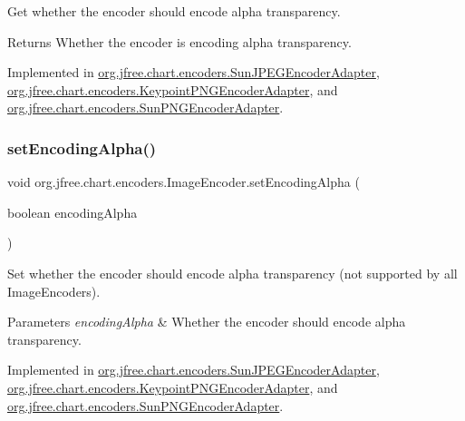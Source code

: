 Get whether the encoder should encode alpha transparency.

\begin{DoxyReturn}{Returns}
Whether the encoder is encoding alpha transparency. 
\end{DoxyReturn}


Implemented in \mbox{\hyperlink{classorg_1_1jfree_1_1chart_1_1encoders_1_1_sun_j_p_e_g_encoder_adapter_a1d9fb1cf5b9a4c0db2ed038a83fd4355}{org.\+jfree.\+chart.\+encoders.\+Sun\+J\+P\+E\+G\+Encoder\+Adapter}}, \mbox{\hyperlink{classorg_1_1jfree_1_1chart_1_1encoders_1_1_keypoint_p_n_g_encoder_adapter_a73ca86c91d8420342f9993c0286e0408}{org.\+jfree.\+chart.\+encoders.\+Keypoint\+P\+N\+G\+Encoder\+Adapter}}, and \mbox{\hyperlink{classorg_1_1jfree_1_1chart_1_1encoders_1_1_sun_p_n_g_encoder_adapter_adc379d171449112333184b52e7292df8}{org.\+jfree.\+chart.\+encoders.\+Sun\+P\+N\+G\+Encoder\+Adapter}}.

\mbox{\label{interfaceorg_1_1jfree_1_1chart_1_1encoders_1_1_image_encoder_a1f75e96b9ec512882b6d32c4f0bac3d2}} 
\subsubsection{\texorpdfstring{set\+Encoding\+Alpha()}{setEncodingAlpha()}}
{\footnotesize\ttfamily void org.\+jfree.\+chart.\+encoders.\+Image\+Encoder.\+set\+Encoding\+Alpha (\begin{DoxyParamCaption}\item[{boolean}]{encoding\+Alpha }\end{DoxyParamCaption})}

Set whether the encoder should encode alpha transparency (not supported by all Image\+Encoders).


\begin{DoxyParams}{Parameters}
{\em encoding\+Alpha} & Whether the encoder should encode alpha transparency. \\
\hline
\end{DoxyParams}


Implemented in \mbox{\hyperlink{classorg_1_1jfree_1_1chart_1_1encoders_1_1_sun_j_p_e_g_encoder_adapter_ad41ef8a4ba5d9044dc3f1ac656c43504}{org.\+jfree.\+chart.\+encoders.\+Sun\+J\+P\+E\+G\+Encoder\+Adapter}}, \mbox{\hyperlink{classorg_1_1jfree_1_1chart_1_1encoders_1_1_keypoint_p_n_g_encoder_adapter_aa033b27927358b154fa3eb7193454e14}{org.\+jfree.\+chart.\+encoders.\+Keypoint\+P\+N\+G\+Encoder\+Adapter}}, and \mbox{\hyperlink{classorg_1_1jfree_1_1chart_1_1encoders_1_1_sun_p_n_g_encoder_adapter_a105f0b1888336e8bd7b5716a05d1184a}{org.\+jfree.\+chart.\+encoders.\+Sun\+P\+N\+G\+Encoder\+Adapter}}.

